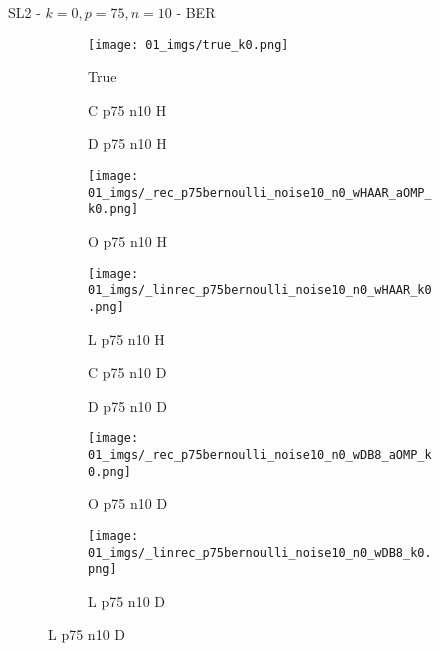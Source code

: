 \begin{frame}{SL2 - $k=0,p=75,n=10$ - BER}{}
\begin{figure}
\begin{subfigure}{0.1\textwidth}
\texttt{[image: 01\_imgs/true\_k0.png]}
\caption*{\Tiny True}
\end{subfigure}
\begin{subfigure}{0.1\textwidth}
\caption*{\Tiny C p75 n10 H}
\end{subfigure}
\begin{subfigure}{0.1\textwidth}
\caption*{\Tiny D p75 n10 H}
\end{subfigure}
\begin{subfigure}{0.1\textwidth}
\texttt{[image: 01\_imgs/\_rec\_p75bernoulli\_noise10\_n0\_wHAAR\_aOMP\_k0.png]}
\caption*{\Tiny O p75 n10 H}
\end{subfigure}
\begin{subfigure}{0.1\textwidth}
\texttt{[image: 01\_imgs/\_linrec\_p75bernoulli\_noise10\_n0\_wHAAR\_k0.png]}
\caption*{\Tiny L p75 n10 H}
\end{subfigure}
\begin{subfigure}{0.1\textwidth}
\caption*{\Tiny C p75 n10 D}
\end{subfigure}
\begin{subfigure}{0.1\textwidth}
\caption*{\Tiny D p75 n10 D}
\end{subfigure}
\begin{subfigure}{0.1\textwidth}
\texttt{[image: 01\_imgs/\_rec\_p75bernoulli\_noise10\_n0\_wDB8\_aOMP\_k0.png]}
\caption*{\Tiny O p75 n10 D}
\end{subfigure}
\begin{subfigure}{0.1\textwidth}
\texttt{[image: 01\_imgs/\_linrec\_p75bernoulli\_noise10\_n0\_wDB8\_k0.png]}
\caption*{\Tiny L p75 n10 D}
\end{subfigure}
\end{figure}
\end{frame}


